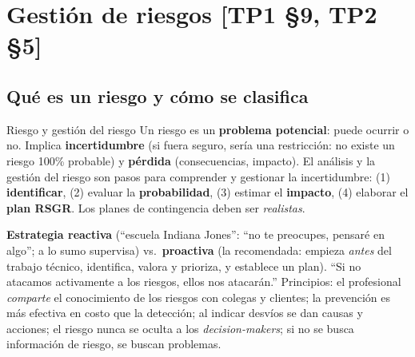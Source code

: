 \documentclass[11pt,a4paper]{article}
\begin{document}
\section[Gestión de riesgos]{Gestión de riesgos \hfill {\normalsize [TP1 §9, TP2 §5]}}
\label{sec:riesgos}
\subsection{Qué es un riesgo y cómo se clasifica}
\begin{defbox}{Riesgo y gestión del riesgo}
Un riesgo es un \textbf{problema potencial}: puede ocurrir o no. Implica \textbf{incertidumbre} (si fuera
seguro, sería una restricción: no existe un riesgo 100\% probable) y \textbf{pérdida} (consecuencias, impacto).
El análisis y la gestión del riesgo son pasos para comprender y gestionar la incertidumbre: (1)
\textbf{identificar}, (2) evaluar la \textbf{probabilidad}, (3) estimar el \textbf{impacto}, (4) elaborar el
\textbf{plan RSGR}. Los planes de contingencia deben ser \emph{realistas}.
\end{defbox}
\textbf{Estrategia reactiva} (``escuela Indiana Jones'': ``no te preocupes, pensaré en algo''; a lo sumo
supervisa) vs.\ \textbf{proactiva} (la recomendada: empieza \emph{antes} del trabajo técnico, identifica, valora
y prioriza, y establece un plan). ``Si no atacamos activamente a los riesgos, ellos nos atacarán.'' Principios:
el profesional \emph{comparte} el conocimiento de los riesgos con colegas y clientes; la prevención es más
efectiva en costo que la detección; al indicar desvíos se dan causas y acciones; el riesgo nunca se oculta a los
\emph{decision-makers}; si no se busca información de riesgo, se buscan problemas.
\end{document}
